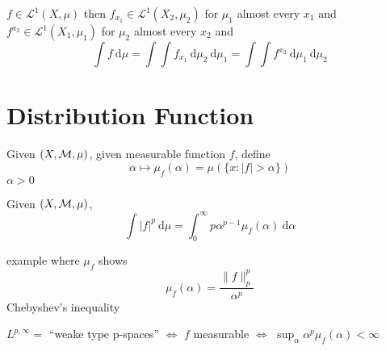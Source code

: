 \begin{theorem}
  $f \in \mathcal{L}^1(X, \mu)$ then $f_{x_1} \in \mathcal{L}^1(X_2, \mu_2)$ for $\mu_1$ almost every $x_1$ and $f^{x_2} \in \mathcal{L}^1(X_1, \mu_1)$ for $\mu_2$ almost every $x_2$
  and 
  \[\int f \ \mathrm{d}\mu = \int \int f_{x_1} \ \mathrm{d}\mu_2 \ \mathrm{d}\mu_1 = \int \int f^{x_2} \ \mathrm{d}\mu_1 \ \mathrm{d}\mu_2\]
\end{theorem}

\section{Distribution Function}
\begin{definition}
  Given $(X, \mathcal M, \mu)$, given measurable function $f$, define
  \[\alpha \mapsto \mu_f(\alpha) = \mu(\{x : |f| > \alpha\})\]
  $\alpha > 0$
\end{definition}

\begin{theorem}
  Given $(X, \mathcal M, \mu)$, 
  \[\int |f|^p \ \mathrm{d}\mu = \int_0^\infty p\alpha^{p-1} \mu_f(\alpha) \ \mathrm{d}\alpha\]
\end{theorem}

\begin{example}
  example where $\mu_f$ shows
  \[\mu_f(\alpha) = \frac{\|f\|^p_p}{\alpha^p}\]
  Chebyshev's inequality

  $L^{p, \infty} =$ ``weake type p-spaces'' $\iff$ $f$ measurable $\iff$ $\sup_{\alpha} \alpha^p \mu_f(\alpha) < \infty$
\end{example}

